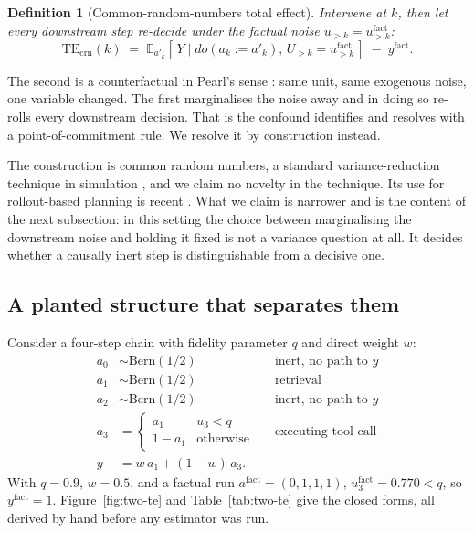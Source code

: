 \documentclass[11pt]{article}
\newtheorem{definition}{Definition}
\theoremstyle{remark}
\newcommand{\TEcrn}{\mathrm{TE}_{\mathrm{crn}}}
\newcommand{\Ex}{\mathbb{E}}
\begin{document}
\begin{definition}[Common-random-numbers total effect]
Intervene at $k$, then let every downstream step re-decide under the
\emph{factual} noise $u_{>k} = u^{\mathrm{fact}}_{>k}$:
\[
  \TEcrn(k) \;=\; \Ex_{a'_k}\!\left[\,Y \mid do(a_k := a'_k),\,
                  U_{>k} = u^{\mathrm{fact}}_{>k}\,\right]
             \;-\; y^{\mathrm{fact}} .
\]
\end{definition}

The second is a counterfactual in Pearl's sense \citep{pearl2009}: same unit,
same exogenous noise, one variable changed. The first marginalises the noise
away and in doing so re-rolls every downstream decision. That is the confound
\citet{car2026} identifies and resolves with a point-of-commitment rule. We
resolve it by construction instead.

The construction is common random numbers, a standard variance-reduction
technique in simulation \citep{lawkelton2000}, and we claim no novelty in the
technique. Its use for rollout-based planning is recent \citep{yadav2026}. What
we claim is narrower and is the content of the next subsection: in this setting
the choice between marginalising the downstream noise and holding it fixed is
not a variance question at all. It decides whether a causally inert step is
distinguishable from a decisive one.

\subsection{A planted structure that separates them}

Consider a four-step chain with fidelity parameter $q$ and direct weight $w$:
\begin{align}
  a_0 &\sim \mathrm{Bern}(1/2) && \text{inert, no path to } y \nonumber\\
  a_1 &\sim \mathrm{Bern}(1/2) && \text{retrieval} \nonumber\\
  a_2 &\sim \mathrm{Bern}(1/2) && \text{inert, no path to } y \label{eq:scm}\\
  a_3 &= \begin{cases} a_1 & u_3 < q\\ 1-a_1 & \text{otherwise}\end{cases}
      && \text{executing tool call} \nonumber\\
  y   &= w\,a_1 + (1-w)\,a_3 . \nonumber
\end{align}
With $q = 0.9$, $w = 0.5$, and a factual run
$a^{\mathrm{fact}} = (0,1,1,1)$, $u_3^{\mathrm{fact}} = 0.770 < q$, so
$y^{\mathrm{fact}} = 1$. Figure~\ref{fig:two-te} and Table~\ref{tab:two-te} give the closed forms, all
derived by hand before any estimator was run.
\end{document}
